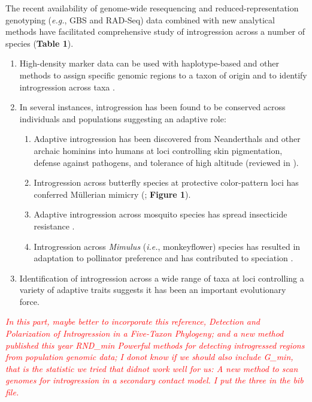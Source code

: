 \documentclass[11pt]{article}
\newcommand{\lwang}[1]{\textcolor{red}{ \emph{\scriptsize  #1}} } %
\begin{document}
The recent availability of genome-wide resequencing and reduced-representation genotyping (\emph{e.g.}, GBS and RAD-Seq) data combined with new analytical methods have facilitated comprehensive study of introgression across a number of species (\textbf{Table 1}).
\begin{enumerate}
\item{High-density marker data can be used with haplotype-based and other methods to assign specific genomic regions to a taxon of origin and to identify introgression across taxa \cite{Martin2015,Price2009,Lawson2012,pease2015,rosenzweig2016,geneva2015}.}
\item{In several instances, introgression has been found to be conserved across individuals and populations suggesting an adaptive role:}
	\begin{enumerate}
	\item{Adaptive introgression has been discovered from Neanderthals and other archaic hominins into humans at loci controlling skin pigmentation, defense against pathogens, and tolerance of high altitude (reviewed in \cite{Racimo2015}}).
	\item{Introgression across butterfly species at protective color-pattern loci has conferred M\"{u}llerian mimicry (\cite{Heliconius2012}; \textbf{Figure 1})}.
	\item{Adaptive introgression across mosquito species has spread insecticide resistance \cite{Norris2015}}.
	\item{Introgression across \emph{Mimulus} (\emph{i.e.}, monkeyflower) species has resulted in adaptation to pollinator preference and has contributed to speciation \cite{Stankowski2015}}.
	\end{enumerate}
\item{Identification of introgression across a wide range of taxa at loci controlling a variety of adaptive traits suggests it has been an important evolutionary force.}
\end{enumerate}



\lwang{In this part, maybe better to incorporate this reference, Detection and Polarization of Introgression in a Five-Taxon Phylogeny; and a new method published this year RND\_min Powerful methods for detecting introgressed regions from population genomic data; I donot know if we should also include G\_min, that is the statistic we tried that didnot work well for us: A new method to scan genomes for introgression in a secondary contact model. I put the three in the bib file.}
\end{document}

